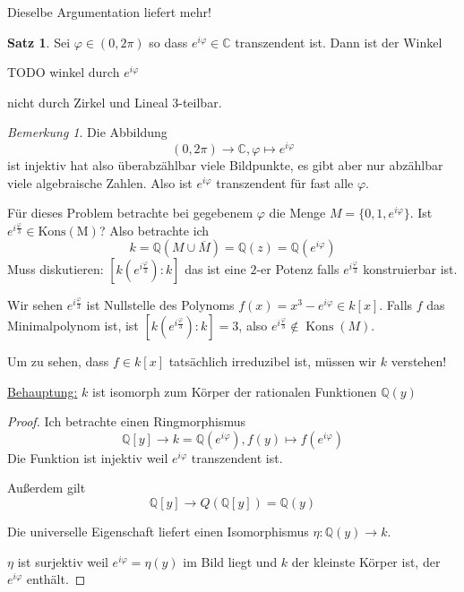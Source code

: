 \documentclass[12pt,parskip=full]{scrartcl}
\newcommand{\setQ}{\mathbb{Q}}
\newcommand{\setC}{\mathbb{C}}
\newcommand{\heading}{\underline}
\theoremstyle{definition}
\newtheorem{theorem}{Satz}[section]
\theoremstyle{remark}
\newtheorem*{remark}{Bemerkung}
\begin{document}
	Dieselbe Argumentation liefert mehr!
	
	\begin{theorem}
		Sei $\varphi \in (0,2\pi)$ so dass $e^{i \varphi} \in \setC$ transzendent ist. Dann ist der Winkel
		
		TODO winkel durch $e^{i\varphi}$
		
		nicht durch Zirkel und Lineal $3$-teilbar.
	\end{theorem}

	\begin{remark}
		Die Abbildung
		\begin{equation*}
			(0, 2\pi) \to \setC, \varphi \mapsto e^{i \varphi}
		\end{equation*}
		ist injektiv hat also überabzählbar viele Bildpunkte, es gibt aber nur abzählbar viele algebraische Zahlen. Also ist $e^{i \varphi}$ transzendent für fast alle $\varphi$.
	\end{remark}

	Für dieses Problem betrachte bei gegebenem $\varphi$ die Menge $M = \{ 0, 1, e^{i \varphi} \}$. Ist $e^{i \frac{\varphi}{3}} \in \operatorname{Kons(M)}$? Also betrachte ich
	\begin{equation*}
		k = \setQ(M \cup \overline{M}) = \setQ(z) = \setQ(e^{i \varphi})
	\end{equation*}
	Muss diskutieren: $[k(e^{i \frac{\varphi}{3}}): k]$ das ist eine $2$-er Potenz falls $e^{i \frac{\varphi}{3}}$ konstruierbar ist.
	
	Wir sehen $e^{i \frac{\varphi}{3}}$ ist Nullstelle des Polynoms $f(x) = x^3 - e^{i \varphi} \in k[x]$. Falls $f$ das Minimalpolynom ist, ist $[k(e^{i \frac{\varphi}{3}}): k] = 3$, also $e^{i \frac{\varphi}{3}} \notin \operatorname{Kons}(M)$.
	
	Um zu sehen, dass $f \in k[x]$ tatsächlich irreduzibel ist, müssen wir $k$ verstehen!
	
	\heading{Behauptung:} $k$ ist isomorph zum Körper der rationalen Funktionen $\setQ(y)$
	
	\begin{proof}
		Ich betrachte einen Ringmorphismus
		\begin{equation*}
			\setQ[y] \to k = \setQ(e^{i \varphi}), f(y) \mapsto f(e^{i \varphi})
		\end{equation*}
		Die Funktion ist injektiv weil $e^{i \varphi}$ transzendent ist.
		
		Außerdem gilt
		\begin{equation*}
			\setQ[y] \to Q(\setQ[y]) = \setQ(y)
		\end{equation*}
		
		Die universelle Eigenschaft liefert einen Isomorphismus $\eta: \setQ(y) \to k$.
		
		$\eta$ ist surjektiv weil $e^{i \varphi} = \eta(y)$ im Bild liegt und $k$ der kleinste Körper ist, der $e^{i \varphi}$ enthält.
	\end{proof}
\end{document}
